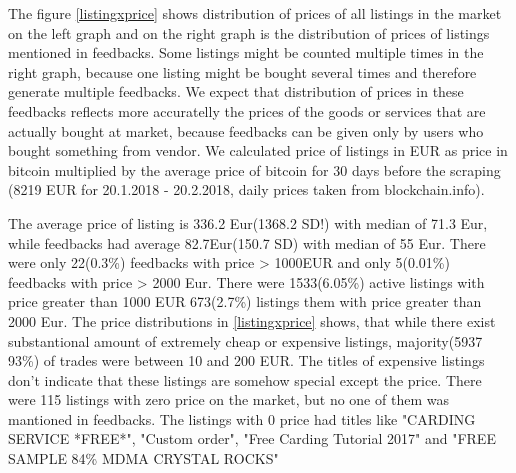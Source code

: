 \documentclass[
  digital, %
  table,   %
  lof,     %
  lot,     %
  oneside
]{fithesis3}
\begin{document}
The figure \ref{listingxprice} shows distribution of prices of all listings in
 the market on the left graph and on the right graph is the distribution of prices
 of listings mentioned in feedbacks. Some listings might be counted multiple times
 in the right graph, because one listing might be bought several times
 and therefore generate multiple feedbacks. We expect that distribution
 of prices in these feedbacks reflects more accuratelly the prices of the goods or services
 that are actually bought at market, because feedbacks can be given only by users who
 bought something from vendor. We calculated price of listings in EUR as 
 price in bitcoin multiplied by the average price of bitcoin for 30 days before the scraping
 (8219 EUR for 20.1.2018 - 20.2.2018, daily prices taken from blockchain.info).
 
 The average price of listing is 336.2 Eur(1368.2 SD!) with median of 71.3 Eur,
 while feedbacks had average 82.7Eur(150.7 SD) with median of 55 Eur.
  There were only 22(0.3\%) feedbacks with price > 1000EUR
 and only 5(0.01\%) feedbacks with price > 2000 Eur.
  There were 1533(6.05\%) active listings
 with price greater than 1000 EUR
 673(2.7\%) listings them with price greater than 2000 Eur.
 The price distributions in \ref{listingxprice} shows,
 that while there exist substantional amount of extremely cheap or expensive listings,
 majority(5937 93\%) of trades were between 10 and 200 EUR.
 The titles of expensive listings don't indicate that 
these listings are somehow special except the price.
 There were 115 listings with zero price on the market,
 but no one of them was mantioned in feedbacks.
 The listings with 0 price had titles like "CARDING SERVICE *FREE*",
 "Custom order", "Free Carding Tutorial 2017" and "FREE SAMPLE 84\% MDMA CRYSTAL ROCKS"
\end{document}
